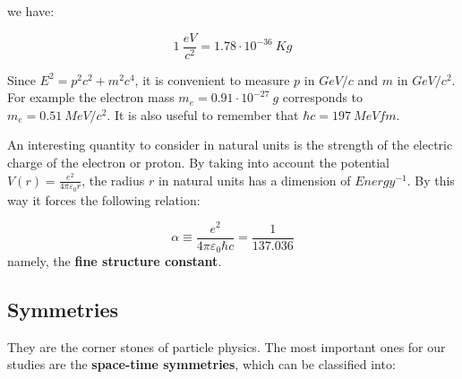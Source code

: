 \documentclass[../../main/main.tex]{subfiles}
\begin{document}
we have:

\[
    1 \ \frac{\si{eV}}{c^2} = 1.78 \cdot 10^{-36} \ \si{Kg}
\]

Since \( E^2 = p^2 c^2 + m^2 c^4 \), it is convenient to measure \( p \) in \( \si{GeV/c} \) and \( m \) in \( \si{GeV/c^2} \). For example the electron mass \( m_e = 0.91 \cdot 10^{-27} \ \si{g} \) corresponds to \( m_e = 0.51 \ \si{MeV/c^2} \). It is also useful to remember that \( \hbar c = 197 \ \si{MeV fm} \).

An interesting quantity to consider in natural units is the strength of the electric charge of the electron or proton. By taking into account the potential \( V(r) = \frac{e^2}{4 \pi \varepsilon_0 r} \), the radius \( r \) in natural units has a dimension of \( \si{Energy^{-1}} \). By this way it forces the following relation:

\begin{equation}
    \alpha
    \equiv
    \frac{e^2}{4\pi \varepsilon_0 \hbar c}
    =
    \frac{1}{137.036}
    \label{eq:L01_FSC}
\end{equation}
namely, the \textbf{fine structure constant}.




\subsection*{Symmetries}
They are the corner stones of particle physics. The most important ones for our studies are the \textbf{space-time symmetries}, which can be classified into:
\end{document}
